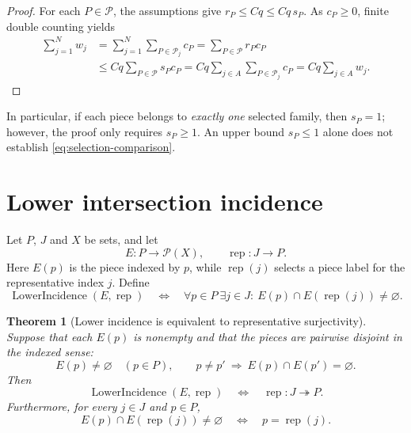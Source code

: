 \documentclass[11pt, letterpaper]{nyjm}
\newtheorem{theorem}{Theorem}[section]
\newcommand{\calP}{\mathcal{P}}
\newcommand{\rep}{\operatorname{rep}}
\newcommand{\LowerIncidence}{\operatorname{LowerIncidence}}
\begin{document}
	\begin{proof}
		For each $P\in\calP$, the assumptions give
		$r_P\leq Cq\leq Cq\,s_P$. As $c_P\geq0$, finite double counting yields
		\begin{align*}
			\sum_{j=1}^{N}w_j
			&=\sum_{j=1}^{N}\sum_{P\in\calP_j}c_P
			=\sum_{P\in\calP}r_Pc_P\\
			&\leq Cq\sum_{P\in\calP}s_Pc_P
			=Cq\sum_{j\in A}\sum_{P\in\calP_j}c_P
			=Cq\sum_{j\in A}w_j.
		\end{align*}
	\end{proof}
	
	\noindent
	In particular, if each piece belongs to \emph{exactly one} selected
	family, then $s_P=1$; however, the proof only requires $s_P\geq1$.
	An upper bound $s_P\leq1$ alone does not establish
	\eqref{eq:selection-comparison}.
	
	\section{Lower intersection incidence}
	
	Let $P$, $J$ and $X$ be sets, and let
	\[
	E:P\longrightarrow\mathcal P(X),\qquad
	\rep:J\longrightarrow P.
	\]
	Here $E(p)$ is the piece indexed by $p$, while $\rep(j)$ selects a
	piece label for the representative index $j$. Define
	\begin{equation}\label{eq:lower-incidence}
		\LowerIncidence(E,\rep)
		\quad\Longleftrightarrow\quad
		\forall p\in P\ \exists j\in J:\ 
		E(p)\cap E(\rep(j))\ne\varnothing.
	\end{equation}
	
	\begin{theorem}[Lower incidence is equivalent to representative
		surjectivity]\label{thm:lower-surjectivity}
		Suppose that each $E(p)$ is nonempty and that the pieces are pairwise
		disjoint in the indexed sense:
		\[
		E(p)\ne\varnothing\quad(p\in P),\qquad
		p\ne p'\ \Longrightarrow\ E(p)\cap E(p')=\varnothing.
		\]
		Then
		\begin{equation}\label{eq:iff-surj}
			\boxed{
				\LowerIncidence(E,\rep)
				\quad\Longleftrightarrow\quad
				\rep:J\twoheadrightarrow P.}
		\end{equation}
		Furthermore, for every $j\in J$ and $p\in P$,
		\begin{equation}\label{eq:exact-incidence}
			E(p)\cap E(\rep(j))\ne\varnothing
			\quad\Longleftrightarrow\quad p=\rep(j).
		\end{equation}
	\end{theorem}
	
\end{document}
